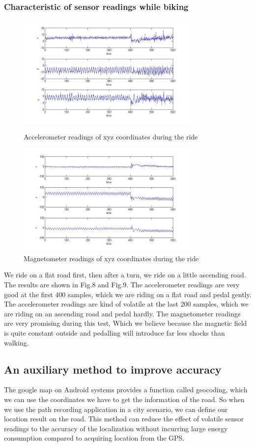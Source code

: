 \documentclass[journal]{IEEEtran}
\begin{document}
\subsubsection{Characteristic of sensor readings while biking}
\begin{figure}
	\centering
	\includegraphics[width=3.5in]{figures/acc-biking}
	\caption{Accelerometer readings of xyz coordinates during the ride}
	\includegraphics[width=3.5in]{figures/mag-biking}
	\caption{Magnetometer readings of xyz coordinates during the ride}
\end{figure}

We ride on a flat road first, then after a turn, we ride on a little ascending road.
The results are shown in Fig.8 and Fig.9.
The accelerometer readings are very good at the first 400 samples, which we are riding on a flat road and pedal gently.
The accelerometer readings are kind of volatile at the last 200 samples, which we are riding on an ascending road and pedal hardly.
The magnetometer readings are very promising during this test, Which we believe because the magnetic field is quite constant outside and pedalling will introduce far less shocks than walking.

\subsection{An auxiliary method to improve accuracy}
The google map on Android systems provides a function called geocoding, which we can use the coordinates we have to get the information of the road. 
So when we use the path recording application in a city scenario, we can define our location result on the road.
This method can reduce the effect of volatile sensor readings to the accuracy of the localization without incurring large energy consumption compared to acquiring location from the GPS.
\end{document}
